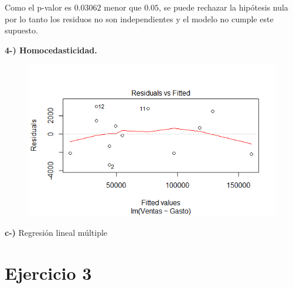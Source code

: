 \documentclass[12pt,a4paper]{article}
\begin{document}
	Como el p-valor es $0.03062$ menor que $0.05$, se puede rechazar la hipótesis nula por lo tanto los residuos no son independientes y el modelo no cumple este supuesto.\\
	
	\newpage
	
	\textbf{4-) Homocedasticidad.}\\
	
	\begin{figure}[h!]
		\centering
		\includegraphics[scale=0.8]{simpleResidualasVsFitted.png}
	\end{figure}

	\textbf{c-)} Regresión lineal múltiple
	
	\section{Ejercicio 3} 
		
\end{document}
